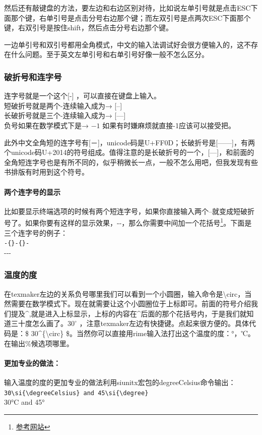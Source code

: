 \documentclass[12pt,oneside]{book}
\begin{document}
\begin{common-format}
然后还有敲键盘的方法，要左边和右边区别对待，比如说左单引号就是点击ESC下面那个键，右单引号是点击分号右边那个键；而左双引号是点两次ESC下面那个键，右双引号是按住shift，然后点击分号右边那个键。

一边单引号和双引号都用全角模式，中文的输入法调试好会很方便输入的，这不存在什么问题。至于英文左单引号和右单引号好像一般不怎么区分。

\subsubsection{破折号和连字号}
连字号就是一个这个[-] ，可以直接在键盘上输入。\\
短破折号就是两个-连续输入成为→  [--]\\
长破折号就是三个-连续输入成为→  [---]\\
负号如果在数学模式下是→  $ -1 $  如果有时嫌麻烦就直接-1应该可以接受把。

此外中文全角短的连字号有[－]，unicode码是U+FF0D；长破折号是[——]，有两个unicode码U+2014的符号组成。值得注意的是长破折号的一个，[—]，和前面的全角短连字号也是有所不同的，似乎稍微长一点，一般不怎么用吧，但我发现有些书排版有时用到这个符号。

\paragraph{两个连字号的显示}
比如要显示终端选项的时候有两个短连字号，如果你直接输入两个--就变成短破折号了。如果你要有这样的显示效果，-{}-，那么你需要中间加一个花括号\footnote{\href{http://tex.stackexchange.com/questions/9813/how-can-i-stop-latex-from-converting-two-hyphens-to-a-single-hyphen-when-loading}{参考网站}}。下面是三个连字号的例子：\\
\verb+-{}-{}-+\\
-{}-{}-


\subsubsection{温度的度}
在texmaker左边的关系负号哪里我们可以看到一个小圆圈，输入命令是\textbackslash circ，当然需要在数学模式下。现在就需要让这个小圆圈位于上标即可。前面的符号介绍我们提及\^{},就是进入上标显示，上标的内容在\^{}后面的那个花括号内，于是我们就知道三十度怎么画了。$ 30^{\circ} $ ，注意texmaker左边有快捷键。点起来很方便的。具体代码是：\$ 30\^{}\{\textbackslash circ\} \$。当然你可以直接用rime输入法打出这个温度的度：°，℃。在输出\%候选项哪里。

\paragraph{更加专业的做法：}
输入温度的度的更加专业的做法利用siunitx宏包的degreeCelsius命令输出：\\
\verb+30\si{\degreeCelsius} and 45\si{\degree}+\\
30\si{\degreeCelsius} and 45\si{\degree}



\end{common-format}
\end{document}
